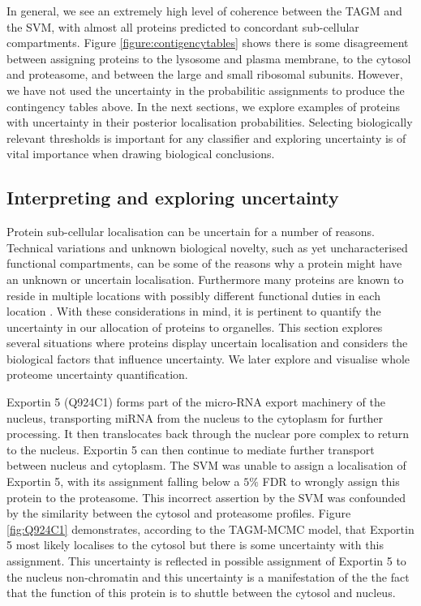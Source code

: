 \documentclass[10pt,letterpaper]{article}\usepackage[]{graphicx}\usepackage[]{color}
\begin{document}
In general, we see an extremely high level of coherence between the
TAGM and the SVM, with almost all proteins predicted to concordant
sub-cellular compartments. Figure \ref{figure:contigencytables} shows
there is some disagreement between assigning proteins to the lysosome
and plasma membrane, to the cytosol and proteasome, and between the
large and small ribosomal subunits.  However, we have not used the
uncertainty in the probabilitic assignments to produce the contingency
tables above. In the next sections, we explore examples of proteins
with uncertainty in their posterior localisation
probabilities. Selecting biologically relevant thresholds is important
for any classifier and exploring uncertainty is of vital importance
when drawing biological conclusions.


\subsection*{Interpreting and exploring uncertainty}

Protein sub-cellular localisation can be uncertain for a number of
reasons. Technical variations and unknown biological novelty, such as
yet uncharacterised functional compartments, can be some of the
reasons why a protein might have an unknown or uncertain
localisation. Furthermore many proteins are known to reside in
multiple locations with possibly different functional duties in each
location \cite{Jeffery:2009}. With these considerations in mind, it is pertinent to
quantify the uncertainty in our allocation of proteins to organelles.
This section explores several situations where proteins display
uncertain localisation and considers the biological factors that
influence uncertainty.  We later explore and visualise whole proteome
uncertainty quantification.

\bigskip

Exportin 5 (Q924C1) forms part of the micro-RNA export machinery of
the nucleus, transporting miRNA from the nucleus to the cytoplasm for
further processing.  It then translocates back through the nuclear
pore complex to return to the nucleus.  Exportin 5 can then continue
to mediate further transport between nucleus and cytoplasm.  The SVM
was unable to assign a localisation of Exportin 5, with its assignment
falling below a $5\%$ FDR to wrongly assign this protein to the
proteasome. This incorrect assertion by the SVM was confounded by the
similarity between the cytosol and proteasome profiles.  Figure
\ref{fig:Q924C1} demonstrates, according to the TAGM-MCMC model, that
Exportin 5 most likely localises to the cytosol but there is some
uncertainty with this assignment.  This uncertainty is reflected in
possible assignment of Exportin 5 to the nucleus non-chromatin and
this uncertainty is a manifestation of the the fact that the function
of this protein is to shuttle between the cytosol and nucleus.
\end{document}
